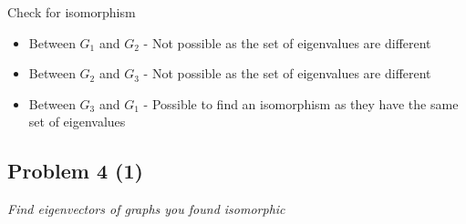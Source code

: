 \documentclass[12pt,a4paper]{article}
\begin{document}
Check for isomorphism
\begin{itemize}
    \item Between $G_1$ and $G_2$ - Not possible as the set of eigenvalues are different
    \item Between $G_2$ and $G_3$ - Not possible as the set of eigenvalues are different
    \item Between $G_3$ and $G_1$ - Possible to find an isomorphism as they have the same set of eigenvalues
\end{itemize}

\newpage
\subsection*{Problem 4 (1)}
\textit{
    Find eigenvectors of graphs you found isomorphic
}
\end{document}

